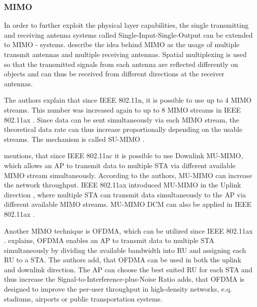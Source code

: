 \subsubsection*{\acf{MIMO}}
In order to further exploit the physical layer capabilities, the single transmitting and receiving antenna systems called Single-Input-Single-Output can be extended to \ac{MIMO} - systems.
\textcite{sauter_wireless_2022} describe the idea behind \ac{MIMO} as the usage of multiple transmit antennas and multiple receiving antennas. Spatial multiplexing is used so that the transmitted signals
from each antenna are reflected differently on objects and can thus be received from different directions at the receiver antennas.

The authors explain that since IEEE 802.11n, it is possible to use up to \num{4} MIMO streams.
This number was increased again to up to \num{8} MIMO streams in IEEE 802.11ax \cite{noauthor_ieee_2021}.
Since data can be sent simultaneously via each MIMO stream,
the theoretical data rate can thus increase proportionally depending on the usable streams.
The mechanism is called \ac{SU}-\ac{MIMO} \cite{noauthor_ieee_2021}.

\textcite{sauter_wireless_2022} mentions, that since IEEE 802.11ac it is possible to use Downlink \ac{MU}-\ac{MIMO},
which allows an \ac{AP} to transmit data to multiple \ac{STA} via different available \ac{MIMO} stream simultaneously.
According to the authors, \ac{MU}-\ac{MIMO} can increase the network throughput.
IEEE 802.11ax introduced \ac{MU}-\ac{MIMO} in the Uplink direction \cite{noauthor_ieee_2021}, where multiple \ac{STA} can transmit data simultaneously to the \ac{AP} via different available \ac{MIMO} streams.
MU-\ac{MIMO} DCM can also be applied in IEEE 802.11ax \cite{noauthor_ieee_2021}.

Another \ac{MIMO} technique is \ac{OFDMA}, which can be utilized since IEEE 802.11ax \cite{noauthor_ieee_2021, avallone_will_2021, omar_survey_2016}.
\textcite{avallone_will_2021} explains, \ac{OFDMA} enables an \ac{AP} to transmit data to multiple \ac{STA} simultaneously by dividing the available bandwidth into \ac{RU} and assigning each \ac{RU} to a \ac{STA}.
The authors add, that \ac{OFDMA} can be used in both the uplink and downlink direction.
The \ac{AP} can choose the best suited \ac{RU} for each \ac{STA} and thus increase the Signal-to-Interference-plus-Noise Ratio \cite{khorov_tutorial_2019}
\textcite{behara_performance_2022} adds, that \ac{OFDMA} is designed to improve the per-user throughput in high-density networks, e.q.
stadiums, airports or public transportation systems.

